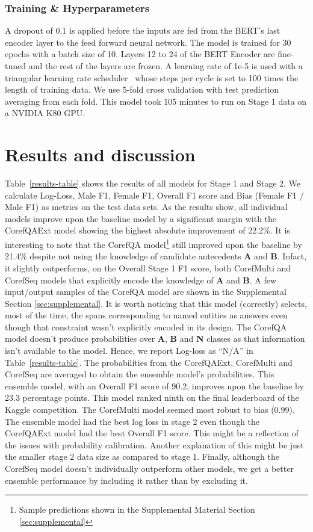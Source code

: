 \documentclass[11pt,a4paper]{article}
\begin{document}
\subsubsection{Training \& Hyperparameters}

A dropout of 0.1 is applied before the inputs are fed from the BERT's last encoder layer to the feed forward neural network. The model is trained for 30 epochs with a batch size of 10. Layers 12 to 24 of the BERT Encoder are fine-tuned and the rest of the layers are frozen. A learning rate of 1e-5 is used with a triangular learning rate scheduler~\cite{smith2017cyclical} whose steps per cycle is set to 100 times the length of training data. We use 5-fold cross validation with test prediction averaging from each fold. This model took 105 minutes to run on Stage 1 data on a NVIDIA K80 GPU.

\section{Results and discussion}
Table~\ref{results-table} shows the results of all models for Stage 1 and Stage 2. We calculate Log-Loss, Male F1, Female F1, Overall F1 score and Bias (Female F1 / Male F1) as metrics on the test data sets. As the results show, all individual models improve upon the baseline model by a significant margin with the CorefQAExt model showing the highest absolute improvement of 22.2\%. It is interesting to note that the CorefQA model\footnote{Sample predictions shown in the Supplemental Material Section \ref{sec:supplemental}} still improved upon the baseline by 21.4\% despite not using the knowledge of candidate antecedents \textbf{A} and \textbf{B}. Infact, it slightly outperforms, on the Overall Stage 1 F1 score, both CorefMulti and CorefSeq models that explicitly encode the knowledge of \textbf{A} and \textbf{B}. A few input/output samples of the CorefQA model are shown in the Supplemental Section \ref{sec:supplemental}. It is worth noticing that this model (correctly) selects, most of the time, the spans corresponding to named entities as answers even though that constraint wasn't explicitly encoded in its design. The CorefQA model doesn't produce probabilities over \textbf{A}, \textbf{B} and \textbf{N} classes as that information isn't available to the model. Hence, we report Log-loss as ``N/A'' in Table~\ref{results-table}. The probabilities from the CorefQAExt, CorefMulti and CorefSeq are averaged to obtain the ensemble model’s probabilities. This ensemble model, with an Overall F1 score of 90.2, improves upon the baseline by 23.3 percentage points. This model ranked ninth on the final leaderboard of the Kaggle competition. The CorefMulti model seemed most robust to bias (0.99). The ensemble model had the best log loss in stage 2 even though the CorefQAExt model had the best Overall F1 score. This might be a reflection of the issues with probability calibration. Another explanation of this might be just the smaller stage 2 data size as compared to stage 1. Finally, although the CorefSeq model doesn't individually outperform other models, we get a better ensemble performance by including it rather than by excluding it.
\end{document}
